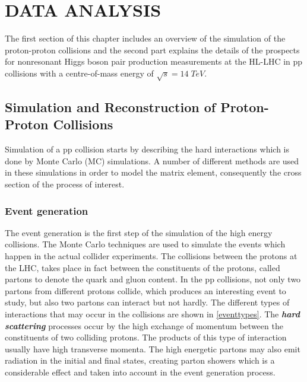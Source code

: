\chapter{DATA ANALYSIS}\label{ch3}

The first section of this chapter includes an overview of the simulation of the proton-proton collisions and the second part explains the details of the prospects for nonresonant Higgs boson pair production measurements at the HL-LHC in pp collisions with a centre-of-mass energy of $\sqrt{s}=14\;TeV$.

\section{Simulation and Reconstruction of Proton-Proton Collisions}

Simulation of a pp collision starts by describing the hard interactions which is done by Monte Carlo (MC) simulations. A number of different methods are used in these simulations in order to model the matrix element, consequently the cross section of the process of interest. 

\subsection{Event generation}

The event generation is the first step of the simulation of the high energy collisions. The Monte Carlo techniques are used to simulate the events which happen in the actual collider experiments. The collisions between the protons at the LHC, takes place in fact between the constituents of the protons, called partons to denote the quark and gluon content. In the pp collisions, not only two partons from different protons collide, which produces an interesting event to study, but also two partons can interact but not hardly. The different types of interactions that may occur in the collisions are shown in \autoref{eventtypes}. The \emph{\bf{hard scattering}} processes occur by the high exchange of momentum between the constituents of two colliding protons. The products of this type of interaction usually have high transverse momenta. The high energetic partons may also emit radiation in the initial and final states, creating parton showers which is a considerable effect and taken into account in the event generation process.

